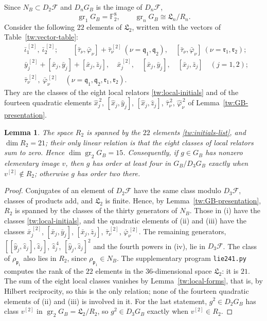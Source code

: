 \documentclass[11pt]{amsart}
\numberwithin{equation}{section}
\newtheorem{lemma}[equation]{Lemma}
\theoremstyle{definition}
\theoremstyle{remark}
\newcommand{\Ftwo}{\mathbb F_2}
\begin{document}
Since $N_B\subset D_2\mathcal F$ and $D_nG_B$ is
the image of $D_n\mathcal F$,
\[
 \operatorname{gr}_1G_B=\Ftwo^8,\qquad
 \operatorname{gr}_nG_B\cong\mathfrak L_n/R_n .
\]
Consider the following $22$ elements of $\mathfrak L_2$, written with the
vectors of Table~\ref{tw:vector-table}:
\begin{equation}\label{tw:initials-list}
\begin{aligned}
 &\bar\iota_1^{\,[2]},\ \bar\iota_2^{\,[2]};\qquad
 [\bar\tau_\nu,\bar\varphi_\nu]+\bar\tau_\nu^{\,[2]}\ (\nu=\mathfrak q_1,\mathfrak q_2),\quad
 [\bar\tau_\nu,\bar\varphi_\nu]\ (\nu=\mathfrak r_1,\mathfrak r_2);\\
 &\bar y_j^{\,[2]}+[\bar x_j,\bar y_j]+[\bar x_j,\bar z_j],\quad
 \bar x_j^{\,[2]},\quad [\bar x_j,\bar y_j],\quad [\bar x_j,\bar z_j]\quad(j=1,2);\\
 &\bar\tau_\nu^{\,[2]},\ \bar\varphi_\nu^{\,[2]}\quad
 (\nu=\mathfrak q_1,\mathfrak q_2,\mathfrak r_1,\mathfrak r_2).
\end{aligned}
\end{equation}
They are the classes of the eight local relators \eqref{tw:local-initials}
and of the fourteen quadratic elements $\hat x_j^{\,2}$,
$[\hat x_j,\hat y_j]$, $[\hat x_j,\hat z_j]$, $\hat\tau_\nu^{\,2}$,
$\hat\varphi_\nu^{\,2}$ of Lemma~\ref{tw:GB-presentation}.

\begin{lemma}\label{tw:quadratic-layer}
The space $R_2$ is spanned by the $22$ elements \eqref{tw:initials-list}, and
$\dim R_2=21$; their only linear relation is that the eight classes of local
relators sum to zero. Hence $\dim\operatorname{gr}_2G_B=15$. Consequently, if
$g\in G_B$ has nonzero elementary image $v$, then $g$ has order at least four
in $G_B/D_3G_B$ exactly when $v^{[2]}\notin R_2$; otherwise $g$ has order two
there.
\end{lemma}

\begin{proof}
Conjugates of an element of $D_2\mathcal F$ have the same class modulo
$D_3\mathcal F$, classes of products add, and $\mathfrak L_2$ is finite.
Hence, by Lemma~\ref{tw:GB-presentation}, $R_2$ is spanned by the classes of
the thirty generators of $N_B$. Those in (i) have the classes
\eqref{tw:local-initials}, and the quadratic elements of (ii) and (iii) have
the classes $\bar x_j^{\,[2]}$, $[\bar x_j,\bar y_j]$, $[\bar x_j,\bar z_j]$,
$\bar\tau_\nu^{\,[2]}$, $\bar\varphi_\nu^{\,[2]}$. The remaining generators,
$[[\hat y_j,\hat z_j],\hat z_j]$, $\hat z_j^{\,4}$, $[\hat y_j,\hat z_j]^2$ and
the fourth powers in (iv), lie in $D_3\mathcal F$. The class of
$\rho_{\mathfrak p_1}$ also lies in $R_2$, since $\rho_{\mathfrak p_1}\in N_B$.
The supplementary program \texttt{lie241.py} computes the rank of the $22$
elements in the $36$-dimensional space $\mathfrak L_2$: it is $21$. The sum of
the eight local classes vanishes by Lemma~\ref{tw:local-forms}, that is, by
Hilbert reciprocity, so this is the only relation; none of the fourteen
quadratic elements of (ii) and (iii) is involved in it. For the last statement, $g^2\in D_2G_B$ has class $v^{[2]}$ in
$\operatorname{gr}_2G_B=\mathfrak L_2/R_2$, so $g^2\in D_3G_B$ exactly when
$v^{[2]}\in R_2$.
\end{proof}
\end{document}
